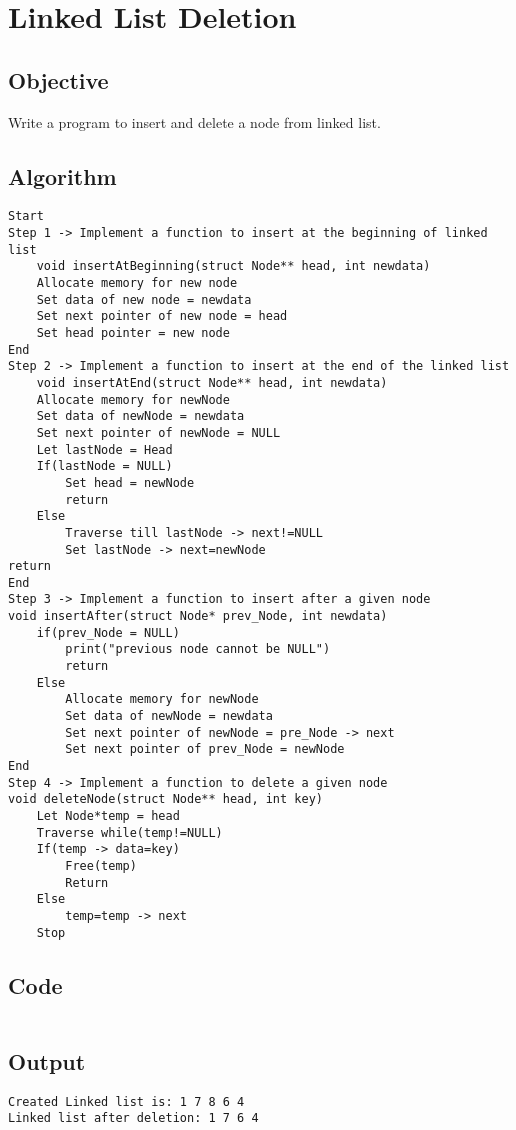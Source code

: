 \section{Linked List Deletion}
\label{sec:Linked List Deletion}

\subsection{Objective}
Write a program to insert and delete a node from linked list.

\subsection{Algorithm}
\begin{lstlisting}[style=mystyle]
Start
Step 1 -> Implement a function to insert at the beginning of linked list
    void insertAtBeginning(struct Node** head, int newdata)
    Allocate memory for new node
    Set data of new node = newdata
    Set next pointer of new node = head
    Set head pointer = new node
End
Step 2 -> Implement a function to insert at the end of the linked list
    void insertAtEnd(struct Node** head, int newdata)
    Allocate memory for newNode
    Set data of newNode = newdata
    Set next pointer of newNode = NULL
    Let lastNode = Head
    If(lastNode = NULL)
        Set head = newNode
        return
    Else
        Traverse till lastNode -> next!=NULL
        Set lastNode -> next=newNode
return
End
Step 3 -> Implement a function to insert after a given node
void insertAfter(struct Node* prev_Node, int newdata)
    if(prev_Node = NULL)
        print("previous node cannot be NULL")
        return
    Else
        Allocate memory for newNode
        Set data of newNode = newdata
        Set next pointer of newNode = pre_Node -> next
        Set next pointer of prev_Node = newNode
End
Step 4 -> Implement a function to delete a given node
void deleteNode(struct Node** head, int key)
    Let Node*temp = head
    Traverse while(temp!=NULL)
    If(temp -> data=key)
        Free(temp)
        Return
    Else
        temp=temp -> next
    Stop
\end{lstlisting}

\subsection{Code}
\inputminted[]{c}{../../Code/linkedListDeletion.c}

\subsection{Output}
\begin{lstlisting}[style=output]
Created Linked list is: 1 7 8 6 4
Linked list after deletion: 1 7 6 4 
\end{lstlisting}

\pagebreak
